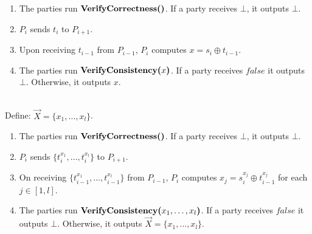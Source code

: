 \begin{protocol}
    \begin{enumerate}
        \item The parties run $\textbf{VerifyCorrectness()}$. If a party receives $\bot$, it outputs $\bot$.
        \item $P_i$ sends $t_i$ to $P_{i + 1}$.
        \item Upon receiving $t_{i - 1}$ from $P_{i - 1}$, $P_i$ computes $x = s_i \oplus t_{i - 1}$.
	\item The parties run $\textbf{VerifyConsistency(}x\textbf{)}$. If a party receives $false$ it outputs $\bot$.
		Otherwise, it outputs $x$.
    \end{enumerate}
\end{protocol}

\begin{protocol}
     \\
    Define: $\vec{X} = \{x_1, \ldots, x_l\}$.
    \begin{enumerate}
	 \item The parties run $\textbf{VerifyCorrectness()}$. If a party receives $\bot$, it outputs $\bot$. 
        \item $P_i$ sends $\{t^{x_1}_i, \ldots, t^{x_l}_i\}$ to $P_{i + 1}$.
        \item On receiving $\{t^{x_1}_{i - 1}, \ldots, t^{x_l}_{i - 1}\}$ from $P_{i - 1}$, $P_i$ computes $x_j = s^{x_j}_i \oplus t^{x_j}_{i - 1}$ for each $j \in [1, l]$.
        \item The parties run $\textbf{VerifyConsistency(}x_1, \ldots, x_l\textbf{)}$.
		If a party receives $false$ it outputs $\bot$.
       Otherwise, it outputs $\vec{X} = \{x_1, \ldots, x_l\}$.
    \end{enumerate}
\end{protocol}
